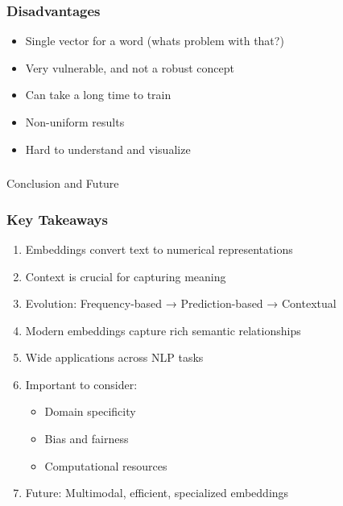 \begin{frame}[fragile]\frametitle{Disadvantages}
\begin{itemize}
\item Single vector for a word (whats problem with that?)
\item Very vulnerable, and not a robust concept
\item Can take a long time to train
\item Non-uniform results
\item Hard to understand and visualize
\end{itemize}
\end{frame}

\begin{frame}[fragile]\frametitle{}

\begin{center}
{\Large Conclusion and Future}
\end{center}
\end{frame}

\begin{frame}[fragile]\frametitle{Key Takeaways}
\begin{enumerate}
\item Embeddings convert text to numerical representations
\item Context is crucial for capturing meaning
\item Evolution: Frequency-based → Prediction-based → Contextual
\item Modern embeddings capture rich semantic relationships
\item Wide applications across NLP tasks
\item Important to consider:
  \begin{itemize}
  \item Domain specificity
  \item Bias and fairness
  \item Computational resources
  \end{itemize}
\item Future: Multimodal, efficient, specialized embeddings
\end{enumerate}
\end{frame}

